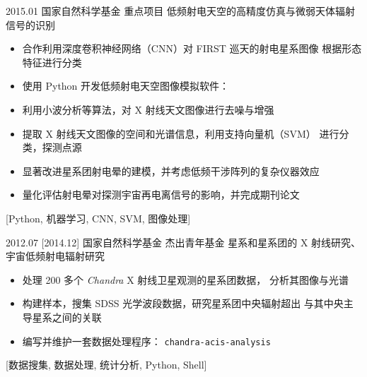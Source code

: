 \documentclass[zh]{resume}
\begin{document}
\begin{projects}
  \project
    {2015.01}%
    {国家自然科学基金}%
    {重点项目}%
    {低频射电天空的高精度仿真与微弱天体辐射信号的识别}%
    {\begin{itemize}
      \item 合作利用深度卷积神经网络（CNN）对 FIRST 巡天的射电星系图像
            根据形态特征进行分类
      \item 使用 Python 开发低频射电天空图像模拟软件：
      \item 利用小波分析等算法，对 X 射线天文图像进行去噪与增强
      \item 提取 X 射线天文图像的空间和光谱信息，利用支持向量机（SVM）
            进行分类，探测点源
      \item 显著改进星系团射电晕的建模，并考虑低频干涉阵列的复杂仪器效应
      \item 量化评估射电晕对探测宇宙再电离信号的影响，并完成期刊论文
    \end{itemize}}%
    [Python, 机器学习, CNN, SVM, 图像处理]

  \separator{0.7em}
  \project
    {2012.07}%
    [2014.12]%
    {国家自然科学基金}%
    {杰出青年基金}%
    {星系和星系团的 X 射线研究、宇宙低频射电辐射研究}%
    {\begin{itemize}
      \item 处理 200 多个 \textit{Chandra} X 射线卫星观测的星系团数据，
            分析其图像与光谱
      \item 构建样本，搜集 SDSS 光学波段数据，研究星系团中央辐射超出
            与其中央主导星系之间的关联
      \item 编写并维护一套数据处理程序：
              {\texttt{chandra-acis-analysis}}
    \end{itemize}}%
    [数据搜集, 数据处理, 统计分析, Python, Shell]
\end{projects}
\end{document}
